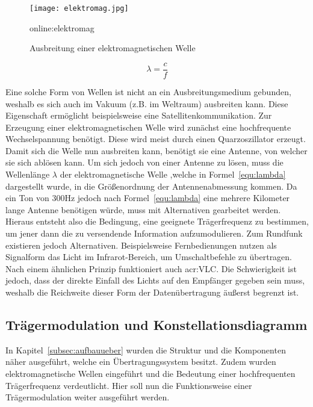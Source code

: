 \begin{figure}[H]
	\centering
	\texttt{[image: elektromag.jpg]}
	\caption[Ausbreitung einer elektromagnetischen Welle]{Ausbreitung einer elektromagnetischen Welle} 
	\gls{online:elektromag}
	\label{fig:elektromag}
\end{figure}
\begin{equation}
	\label{equ:lambda}
	\lambda = \frac{c}{f} 
\end{equation}

Eine solche Form von Wellen ist nicht an ein Ausbreitungsmedium gebunden, weshalb es sich auch im Vakuum (z.B. im Weltraum) ausbreiten kann. Diese Eigenschaft ermöglicht beispielsweise eine Satellitenkommunikation. Zur Erzeugung einer elektromagnetischen Welle wird zunächst eine hochfrequente Wechselspannung benötigt. Diese wird meist durch einen Quarzoszillator erzeugt. Damit sich die Welle nun ausbreiten kann, benötigt sie eine Antenne, von welcher sie sich ablösen kann.\cite{howwireless}\cite{NT} Um sich jedoch von einer Antenne zu lösen, muss die Wellenlänge $\lambda$  der elektromagnetische Welle ,welche in Formel~\ref{equ:lambda} dargestellt wurde, in die Größenordnung der Antennenabmessung kommen. Da ein Ton von 300Hz jedoch nach Formel~\ref{equ:lambda} eine mehrere Kilometer lange Antenne benötigen würde, muss mit Alternativen gearbeitet werden. Hieraus entsteht also die Bedingung, eine geeignete Trägerfrequenz zu bestimmen, um jener dann die zu versendende Information aufzumodulieren.\cite{hftech}\cite{hoeher} Zum Rundfunk existieren jedoch Alternativen. Beispielsweise Fernbedienungen nutzen als Signalform das Licht im Infrarot-Bereich, um Umschaltbefehle zu übertragen. Nach einem ähnlichen Prinzip funktioniert auch \gls{acr:VLC}. Die Schwierigkeit ist jedoch, dass der direkte Einfall des Lichts auf den Empfänger gegeben sein muss, weshalb die Reichweite dieser Form der Datenübertragung äußerst begrenzt ist.

\subsection{Trägermodulation und Konstellationsdiagramm}
\label{subsec:modulationsarten}

In Kapitel~\ref{subsec:aufbauueber} wurden die Struktur und die Komponenten näher ausgeführt, welche ein Übertragungssystem besitzt. Zudem wurden elektromagnetische Wellen eingeführt und die Bedeutung einer hochfrequenten Trägerfrequenz verdeutlicht. Hier soll nun die Funktionsweise einer Trägermodulation weiter ausgeführt werden.  

